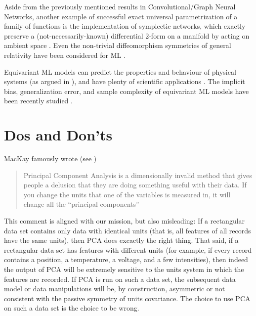 \documentclass{article}
\theoremstyle{plain}
\theoremstyle{definition}
\theoremstyle{remark}
\begin{document}
Aside from the previously mentioned results in Convolutional/Graph Neural Networks, another example of successful exact universal parametrization of a family of functions is the implementation of symplectic networks, which exactly preserve a (not-necessarily-known) differential 2-form on a manifold by acting on ambient space \cite{sympnets,henonnets}. Even the non-trivial diffeomorphism symmetries of general relativity have been considered for ML \cite{weiler}.
 
Equivariant ML models can predict the properties and behaviour of physical systems (as argued in \citealt{cheng2019covariance}), and have plenty of scientific applications \cite{batzner20223, musaelian2022learning, stark2022equibind, yu-physics, wang2022approximately}. The implicit bias, generalization error, and sample complexity of equivariant ML models have been recently studied \cite{lawrence2021implicit, bietti2021sample, elesedy2021provably, elesedy2021kernel, mei2021learning}.

\section{Dos and Don'ts}\label{sec:dos}

MacKay famously wrote (see \citealt{muldoonmedium})
\vspace{-1ex}\begin{quote}Principal Component Analysis is a dimensionally invalid method that gives people a delusion that they are doing something useful with their data. If you change the units that one of the variables is measured in, it will change all the ``principal components''\end{quote}\vspace{-1ex}
This comment is aligned with our mission, but also misleading: If a rectangular data set contains only data with identical units (that is, all features of all records have the same units), then PCA does excactly the right thing.
That said, if a rectangular data set has features with different units (for example, if every record contains a position, a temperature, a voltage, and a few intensities), then indeed the output of PCA will be extremely sensitive to the units system in which the features are recorded.
If PCA is run on such a data set, the subsequent data model or data manipulations will be, by construction, asymmetric or not consistent with the passive symmetry of units covariance.
The choice to use PCA on such a data set is the choice to be wrong.
\end{document}
